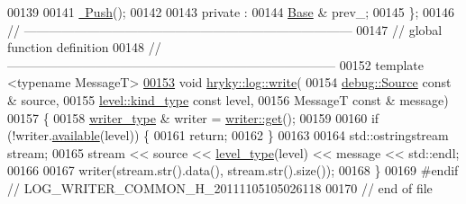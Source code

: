 \begin{DoxyCode}
00139 
00141     \hyperlink{structhryky_1_1log_1_1writer_1_1_push_a3fce2613648599bac54658a141d38275}{~Push}();
00142 
00143 \textcolor{keyword}{private} :
00144     \hyperlink{classhryky_1_1log_1_1writer_1_1_base}{Base} &      prev\_;
00145 \};
00146 \textcolor{comment}{//
      ------------------------------------------------------------------------------}
00147 \textcolor{comment}{// global function definition}
00148 \textcolor{comment}{//
      ------------------------------------------------------------------------------}
00152 \textcolor{comment}{}\textcolor{keyword}{template} <\textcolor{keyword}{typename} MessageT>
\hypertarget{log__writer__common_8h_source_l00153}{}\hyperlink{namespacehryky_1_1log_a5c7e76e7e42521f83c90fc8813f1f3ea}{00153} \textcolor{keywordtype}{void} \hyperlink{namespacehryky_1_1log_a5c7e76e7e42521f83c90fc8813f1f3ea}{hryky::log::write}(
00154     \hyperlink{classhryky_1_1debug_1_1_source}{debug::Source} \textcolor{keyword}{const} & source,
00155     \hyperlink{classhryky_1_1_kind}{level::kind_type} \textcolor{keyword}{const} level,
00156     MessageT \textcolor{keyword}{const} & message)
00157 \{
00158     \hyperlink{classhryky_1_1log_1_1writer_1_1_base}{writer_type} & writer = \hyperlink{namespacehryky_1_1log_1_1writer_a67d38d407be7aaf3cc9ed3ac8e3b2835}{writer::get}();
00159     
00160     \textcolor{keywordflow}{if} (!writer.\hyperlink{classhryky_1_1log_1_1writer_1_1_base_a8ce37ac3efe4c77e4020bdbaebda85b3}{available}(level)) \{
00161         \textcolor{keywordflow}{return};
00162     \}
00163 
00164     std::ostringstream stream;
00165     stream << source << \hyperlink{classhryky_1_1log_1_1level_1_1_entity}{level_type}(level) << message << std::endl;
00166 
00167     writer(stream.str().data(), stream.str().size());
00168 \}
00169 \textcolor{preprocessor}{#endif // LOG\_WRITER\_COMMON\_H\_20111105105026118}
00170 \textcolor{preprocessor}{}\textcolor{comment}{// end of file}
\end{DoxyCode}
